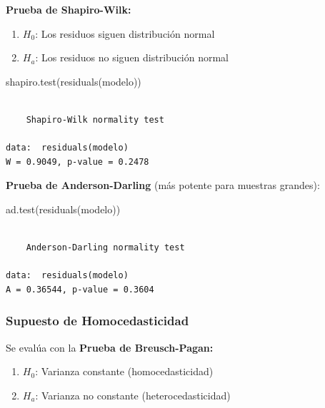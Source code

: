 \documentclass[
  spanish,
  letterpaper,
]{book}
\newenvironment{Shaded}{\begin{snugshade}}{\end{snugshade}}
\newcommand{\FunctionTok}[1]{\textcolor[rgb]{0.28,0.35,0.67}{#1}}
\newcommand{\NormalTok}[1]{\textcolor[rgb]{0.00,0.23,0.31}{#1}}
\begin{document}
\textbf{Prueba de Shapiro-Wilk:}

\begin{enumerate}
\def\labelenumi{\arabic{enumi}.}
\item
  \(H_0​\): Los residuos siguen distribución normal
\item
  \(H_a\)\hspace{0pt}: Los residuos no siguen distribución normal
\end{enumerate}

\begin{Shaded}
\begin{Highlighting}[]
\FunctionTok{shapiro.test}\NormalTok{(}\FunctionTok{residuals}\NormalTok{(modelo))}
\end{Highlighting}
\end{Shaded}

\begin{verbatim}

    Shapiro-Wilk normality test

data:  residuals(modelo)
W = 0.9049, p-value = 0.2478
\end{verbatim}

\textbf{Prueba de Anderson-Darling} (más potente para muestras grandes):

\begin{Shaded}
\begin{Highlighting}[]
\FunctionTok{ad.test}\NormalTok{(}\FunctionTok{residuals}\NormalTok{(modelo))}
\end{Highlighting}
\end{Shaded}

\begin{verbatim}

    Anderson-Darling normality test

data:  residuals(modelo)
A = 0.36544, p-value = 0.3604
\end{verbatim}

\subsubsection{Supuesto de
Homocedasticidad}\label{supuesto-de-homocedasticidad}

Se evalúa con la \textbf{Prueba de Breusch-Pagan:}

\begin{enumerate}
\def\labelenumi{\arabic{enumi}.}
\item
  \(H_0\)\hspace{0pt}: Varianza constante (homocedasticidad)
\item
  \(H_a\)\hspace{0pt}: Varianza no constante (heterocedasticidad)
\end{enumerate}
\end{document}
